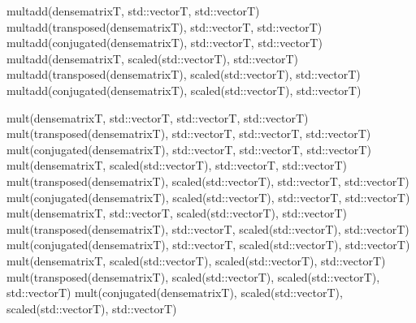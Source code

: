 \documentclass[a4paper,11pt,english]{sphinxmanual}
\begin{document}
\begin{sphinxVerbatim}[commandchars=\\\{\}]
mult\PYGZus{}add(dense\PYGZus{}matrix\PYGZlt{}T\PYGZgt{}, std::vector\PYGZlt{}T\PYGZgt{}, std::vector\PYGZlt{}T\PYGZgt{})
mult\PYGZus{}add(transposed(dense\PYGZus{}matrix\PYGZlt{}T\PYGZgt{}), std::vector\PYGZlt{}T\PYGZgt{}, std::vector\PYGZlt{}T\PYGZgt{})
mult\PYGZus{}add(conjugated(dense\PYGZus{}matrix\PYGZlt{}T\PYGZgt{}), std::vector\PYGZlt{}T\PYGZgt{}, std::vector\PYGZlt{}T\PYGZgt{})
mult\PYGZus{}add(dense\PYGZus{}matrix\PYGZlt{}T\PYGZgt{}, scaled(std::vector\PYGZlt{}T\PYGZgt{}), std::vector\PYGZlt{}T\PYGZgt{})
mult\PYGZus{}add(transposed(dense\PYGZus{}matrix\PYGZlt{}T\PYGZgt{}), scaled(std::vector\PYGZlt{}T\PYGZgt{}),
         std::vector\PYGZlt{}T\PYGZgt{})
mult\PYGZus{}add(conjugated(dense\PYGZus{}matrix\PYGZlt{}T\PYGZgt{}), scaled(std::vector\PYGZlt{}T\PYGZgt{}),
         std::vector\PYGZlt{}T\PYGZgt{})

mult(dense\PYGZus{}matrix\PYGZlt{}T\PYGZgt{}, std::vector\PYGZlt{}T\PYGZgt{}, std::vector\PYGZlt{}T\PYGZgt{}, std::vector\PYGZlt{}T\PYGZgt{})
mult(transposed(dense\PYGZus{}matrix\PYGZlt{}T\PYGZgt{}), std::vector\PYGZlt{}T\PYGZgt{}, std::vector\PYGZlt{}T\PYGZgt{},
     std::vector\PYGZlt{}T\PYGZgt{})
mult(conjugated(dense\PYGZus{}matrix\PYGZlt{}T\PYGZgt{}), std::vector\PYGZlt{}T\PYGZgt{}, std::vector\PYGZlt{}T\PYGZgt{},
     std::vector\PYGZlt{}T\PYGZgt{})
mult(dense\PYGZus{}matrix\PYGZlt{}T\PYGZgt{}, scaled(std::vector\PYGZlt{}T\PYGZgt{}), std::vector\PYGZlt{}T\PYGZgt{},
     std::vector\PYGZlt{}T\PYGZgt{})
mult(transposed(dense\PYGZus{}matrix\PYGZlt{}T\PYGZgt{}), scaled(std::vector\PYGZlt{}T\PYGZgt{}),
     std::vector\PYGZlt{}T\PYGZgt{}, std::vector\PYGZlt{}T\PYGZgt{})
mult(conjugated(dense\PYGZus{}matrix\PYGZlt{}T\PYGZgt{}), scaled(std::vector\PYGZlt{}T\PYGZgt{}),
     std::vector\PYGZlt{}T\PYGZgt{}, std::vector\PYGZlt{}T\PYGZgt{})
mult(dense\PYGZus{}matrix\PYGZlt{}T\PYGZgt{}, std::vector\PYGZlt{}T\PYGZgt{}, scaled(std::vector\PYGZlt{}T\PYGZgt{}),
     std::vector\PYGZlt{}T\PYGZgt{})
mult(transposed(dense\PYGZus{}matrix\PYGZlt{}T\PYGZgt{}), std::vector\PYGZlt{}T\PYGZgt{},
     scaled(std::vector\PYGZlt{}T\PYGZgt{}), std::vector\PYGZlt{}T\PYGZgt{})
mult(conjugated(dense\PYGZus{}matrix\PYGZlt{}T\PYGZgt{}), std::vector\PYGZlt{}T\PYGZgt{},
     scaled(std::vector\PYGZlt{}T\PYGZgt{}), std::vector\PYGZlt{}T\PYGZgt{})
mult(dense\PYGZus{}matrix\PYGZlt{}T\PYGZgt{}, scaled(std::vector\PYGZlt{}T\PYGZgt{}), scaled(std::vector\PYGZlt{}T\PYGZgt{}),
  std::vector\PYGZlt{}T\PYGZgt{})
mult(transposed(dense\PYGZus{}matrix\PYGZlt{}T\PYGZgt{}), scaled(std::vector\PYGZlt{}T\PYGZgt{}),
     scaled(std::vector\PYGZlt{}T\PYGZgt{}), std::vector\PYGZlt{}T\PYGZgt{})
mult(conjugated(dense\PYGZus{}matrix\PYGZlt{}T\PYGZgt{}), scaled(std::vector\PYGZlt{}T\PYGZgt{}),
     scaled(std::vector\PYGZlt{}T\PYGZgt{}), std::vector\PYGZlt{}T\PYGZgt{})


\end{sphinxVerbatim}
\end{document}
